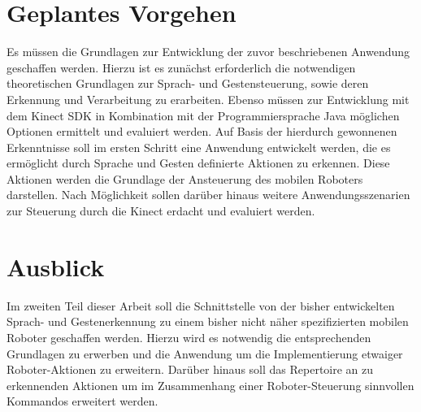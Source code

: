 \section{Geplantes Vorgehen}


%

Es m\"ussen die Grundlagen zur Entwicklung der zuvor beschriebenen Anwendung geschaffen werden. 
Hierzu ist es zun\"achst erforderlich die notwendigen theoretischen Grundlagen zur Sprach- und Gestensteuerung, sowie deren Erkennung und Verarbeitung zu erarbeiten.
Ebenso m\"ussen  zur Entwicklung mit dem Kinect \acrshort{SDK} in Kombination mit der Programmiersprache Java m\"oglichen Optionen ermittelt und evaluiert werden.
Auf Basis der hierdurch gewonnenen Erkenntnisse soll im ersten Schritt eine Anwendung entwickelt werden, die es erm\"oglicht durch Sprache und Gesten definierte Aktionen zu erkennen. 
Diese Aktionen werden die Grundlage der Ansteuerung des mobilen Roboters darstellen.
\newline
Nach M\"oglichkeit sollen dar\"uber hinaus weitere Anwendungsszenarien zur Steuerung durch die Kinect erdacht und evaluiert werden.

\section{Ausblick}


Im zweiten Teil dieser Arbeit soll die Schnittstelle von der bisher entwickelten Sprach- und Gestenerkennung zu einem bisher nicht n\"aher spezifizierten mobilen Roboter geschaffen werden.
Hierzu wird es notwendig die entsprechenden Grundlagen zu erwerben und die Anwendung um die Implementierung etwaiger Roboter-Aktionen zu erweitern.
Dar\"uber hinaus soll das Repertoire an zu erkennenden Aktionen um im Zusammenhang einer Roboter-Steuerung sinnvollen Kommandos erweitert werden.